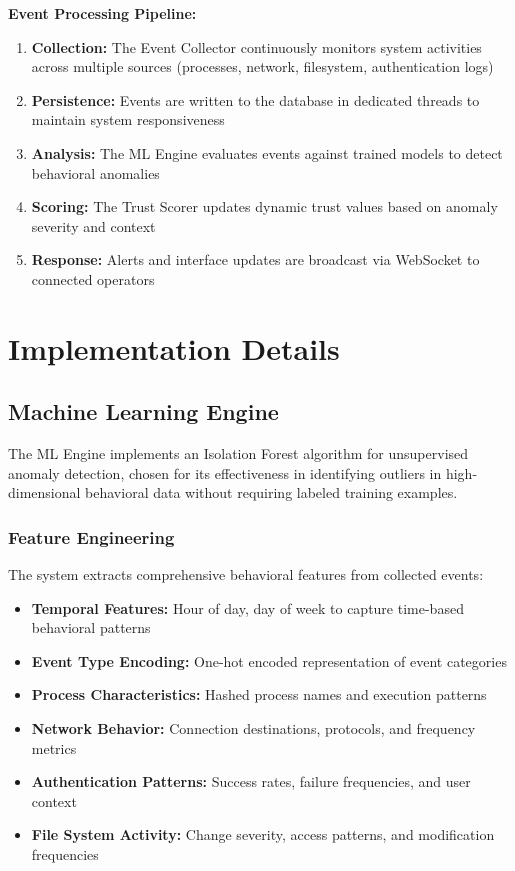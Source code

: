 \documentclass[conference]{IEEEtran}
\begin{document}
\textbf{Event Processing Pipeline:}
\begin{enumerate}
    \item \textbf{Collection:} The Event Collector continuously monitors system activities across multiple sources (processes, network, filesystem, authentication logs)
    \item \textbf{Persistence:} Events are written to the database in dedicated threads to maintain system responsiveness
    \item \textbf{Analysis:} The ML Engine evaluates events against trained models to detect behavioral anomalies
    \item \textbf{Scoring:} The Trust Scorer updates dynamic trust values based on anomaly severity and context
    \item \textbf{Response:} Alerts and interface updates are broadcast via WebSocket to connected operators
\end{enumerate}

\section{Implementation Details}

\subsection{Machine Learning Engine}
The ML Engine implements an Isolation Forest algorithm for unsupervised anomaly detection, chosen for its effectiveness in identifying outliers in high-dimensional behavioral data without requiring labeled training examples.

\subsubsection{Feature Engineering}
The system extracts comprehensive behavioral features from collected events:
\begin{itemize}[leftmargin=*]
  \item \textbf{Temporal Features:} Hour of day, day of week to capture time-based behavioral patterns
  \item \textbf{Event Type Encoding:} One-hot encoded representation of event categories
  \item \textbf{Process Characteristics:} Hashed process names and execution patterns
  \item \textbf{Network Behavior:} Connection destinations, protocols, and frequency metrics  
  \item \textbf{Authentication Patterns:} Success rates, failure frequencies, and user context
  \item \textbf{File System Activity:} Change severity, access patterns, and modification frequencies
\end{itemize}
\end{document}
